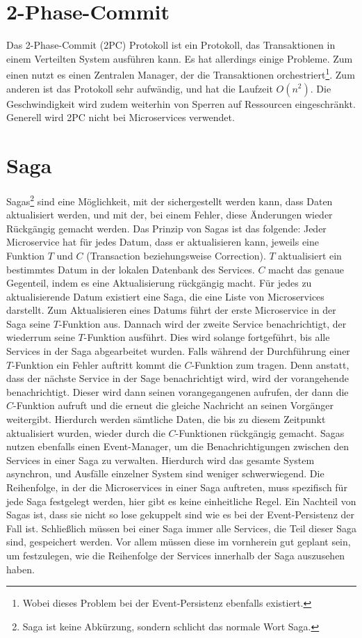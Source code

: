 \section{2-Phase-Commit}
Das 2-Phase-Commit (2PC) Protokoll ist ein Protokoll, das Transaktionen in einem Verteilten System ausführen kann. Es hat allerdings einige Probleme. Zum einen nutzt es einen Zentralen Manager, der die Transaktionen orchestriert\footnote{Wobei dieses Problem bei der Event-Persistenz ebenfalls existiert.}. Zum anderen ist das Protokoll sehr aufwändig, und hat die Laufzeit $O(n^2)$. Die Geschwindigkeit wird zudem weiterhin von Sperren auf Ressourcen eingeschränkt. Generell wird 2PC nicht bei Microservices verwendet.

\section{Saga}
Sagas\footnote{Saga ist keine Abkürzung, sondern schlicht das normale Wort \glqq Saga\grqq.} sind eine Möglichkeit, mit der sichergestellt werden kann, dass Daten aktualisiert werden, und mit der, bei einem Fehler, diese Änderungen wieder Rückgängig gemacht werden.
Das Prinzip von Sagas ist das folgende:
Jeder Microservice hat für jedes Datum, dass er aktualisieren kann, jeweils eine Funktion $T$ und $C$ (Transaction beziehungsweise Correction). $T$ aktualisiert ein bestimmtes Datum in der lokalen Datenbank des Services. $C$ macht das genaue Gegenteil, indem es eine Aktualisierung rückgängig macht. Für jedes zu aktualisierende Datum existiert eine Saga, die eine Liste von Microservices darstellt. Zum Aktualisieren eines Datums führt der erste Microservice in der Saga seine $T$-Funktion aus. Dannach wird der zweite Service benachrichtigt, der wiederrum seine $T$-Funktion ausführt. Dies wird solange fortgeführt, bis alle Services in der Saga abgearbeitet wurden. Falls während der Durchführung einer $T$-Funktion ein Fehler auftritt kommt die $C$-Funktion zum tragen. Denn anstatt, dass der nächste Service in der Sage benachrichtigt wird, wird der vorangehende benachrichtigt. Dieser wird dann seinen vorangegangenen aufrufen, der dann die $C$-Funktion aufruft und die erneut die gleiche Nachricht an seinen Vorgänger weitergibt. Hierdurch werden sämtliche Daten, die bis zu diesem Zeitpunkt aktualisiert wurden, wieder durch die $C$-Funktionen rückgängig gemacht.
Sagas nutzen ebenfalls einen Event-Manager, um die Benachrichtigungen zwischen den Services in einer Saga zu verwalten. Hierdurch wird das gesamte System asynchron, und Ausfälle einzelner System sind weniger schwerwiegend.
Die Reihenfolge, in der die Microservices in einer Saga auftreten, muss spezifisch für jede Saga festgelegt werden, hier gibt es keine einheitliche Regel.
Ein Nachteil von Sagas ist, dass sie nicht so lose gekuppelt sind wie es bei der Event-Persistenz der Fall ist. Schließlich müssen bei einer Saga immer alle Services, die Teil dieser Saga sind, gespeichert werden. Vor allem müssen diese im vornherein gut geplant sein, um festzulegen, wie die Reihenfolge der Services innerhalb der Saga auszusehen haben.\cite{sagas}
